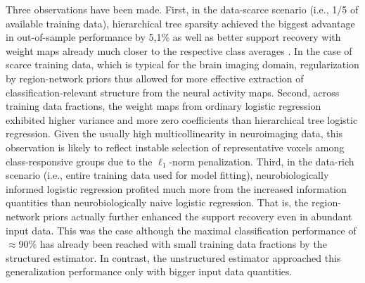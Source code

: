 \documentclass{article}
\begin{document}
Three observations have been made.
First,
in the data-scarce scenario (i.e., 1/5 of available training data),
hierarchical tree sparsity achieved the biggest advantage
in out-of-sample performance by 5,1\% as well as
better support recovery with weight maps already much closer
to the respective class averages
\cite{varoquaux2012small}.
In the case of scarce training data, which is typical for the brain imaging domain,
regularization by region-network priors thus allowed for
more effective extraction of classification-relevant structure
from the neural activity maps.
%
Second,
across training data fractions,
the weight maps from ordinary logistic regression exhibited
higher variance and more zero coefficients
than hierarchical tree logistic regression.
Given the usually high multicollinearity in neuroimaging data,
this observation is likely to reflect instable selection of
representative voxels among class-responsive groups
due to the $\ell_1$-norm penalization.
%
Third,
in the data-rich scenario (i.e., entire training data used for model fitting),
neurobiologically informed logistic regression
profited much more from the increased information quantities than
neurobiologically naive logistic regression.
That is, the region-network priors actually further enhanced the support
recovery even in abundant input data.
This was the case although
the maximal classification performance of $\approx$90\% has already
been reached with small training data fractions by the structured estimator.
In contrast, 
the unstructured estimator approached this generalization performance
only with bigger input data quantities.
%
\end{document}
